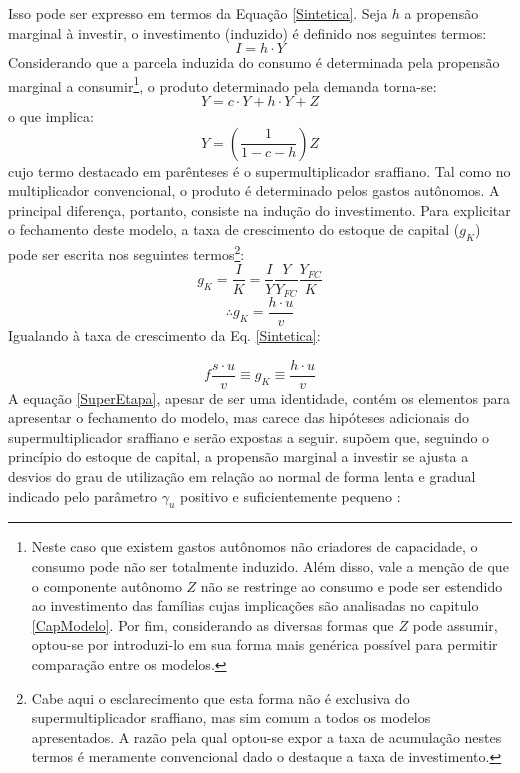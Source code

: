 Isso pode ser expresso em termos da Equação \ref{Sintetica}. Seja $h$ a propensão marginal à investir, o investimento (induzido) é definido nos seguintes termos:
$$
I = h\cdot Y
$$
Considerando que a parcela induzida do consumo é determinada pela propensão marginal a consumir\footnote{Neste caso que existem gastos autônomos não criadores de capacidade, o consumo pode não ser totalmente induzido. Além disso, vale a menção de que o componente autônomo $Z$ não se restringe ao consumo e pode ser estendido ao investimento das famílias cujas implicações são analisadas no capitulo \ref{CapModelo}. Por fim, considerando as diversas formas que $Z$ pode assumir, optou-se por introduzi-lo em sua forma mais genérica possível para permitir comparação entre os modelos.}, o produto determinado pela demanda torna-se:
\begin{equation}
\label{PIBSuper}
    Y = c\cdot Y + h\cdot Y + Z
\end{equation}
o que implica:
\begin{equation}
\label{Supermultiplicador}
Y = \left(\frac{1}{1 - c - h}\right)Z
\end{equation}
cujo termo destacado em parênteses é o supermultiplicador sraffiano. Tal como no multiplicador convencional, o produto é determinado pelos gastos autônomos. A principal diferença, portanto, consiste na indução do investimento. Para explicitar o fechamento deste modelo, a taxa de crescimento do estoque de capital ($g_K$) pode ser escrita nos seguintes termos\footnote{Cabe aqui o esclarecimento que esta forma não é exclusiva do supermultiplicador sraffiano, mas sim comum a todos os modelos apresentados. A razão pela qual optou-se expor a taxa de acumulação nestes termos é meramente convencional dado o destaque a taxa de investimento.}:
$$
g_K = \frac{I}{K} = \frac{I}{Y}\frac{Y}{Y_{FC}}\frac{Y_{FC}}{K}
$$
$$
\therefore g_K = \frac{h\cdot u}{v}
$$
Igualando à taxa de crescimento da Eq. \ref{Sintetica}:

\begin{equation}
\label{SuperEtapa}
f\frac{s\cdot u}{v} \equiv g_K \equiv \frac{h\cdot u}{v}    
\end{equation}
A equação \ref{SuperEtapa}, apesar de ser uma identidade, contém os elementos para apresentar o fechamento do modelo, mas carece das hipóteses adicionais do supermultiplicador sraffiano e serão expostas a seguir. \textcite{freitas_growth_2015} supõem que, seguindo o princípio do estoque de capital, a propensão marginal a investir se ajusta a desvios do grau de utilização em relação ao normal de forma lenta e gradual indicado pelo parâmetro $\gamma_u$ positivo e suficientemente pequeno \cite[p.~271]{freitas_growth_2015}:

